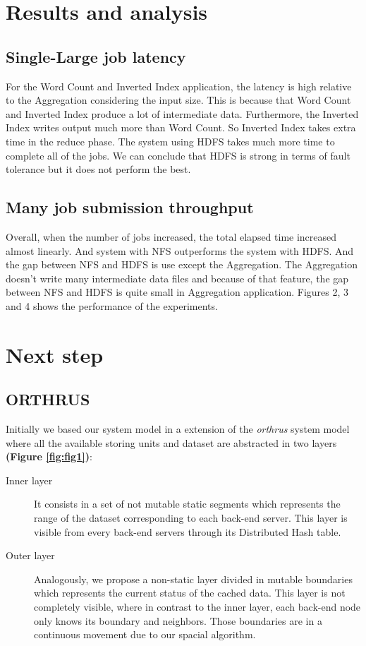 \section*{Results and analysis}
\subsection*{Single-Large job latency}
For the Word Count and Inverted Index application, the latency is high relative to 
the Aggregation considering the input size. This is because that Word Count and Inverted 
Index produce a lot of intermediate data. Furthermore, the Inverted Index writes output 
much more than Word Count. So Inverted Index takes extra time in the reduce phase.
 The system using HDFS takes much more time to complete all of the jobs. We can conclude that HDFS 
is strong in terms of fault tolerance but it does not perform the best.

\subsection*{Many job submission throughput}
Overall, when the number of jobs increased, the total elapsed time increased almost linearly. 
And system with NFS outperforms the system with HDFS. And the gap between NFS and HDFS is use except 
the Aggregation. The Aggregation doesn’t write many intermediate data files and because of that feature, 
the gap between NFS and HDFS is quite small in Aggregation application. Figures 2, 3 and 4 shows the
performance of the experiments.

\section*{Next step}
\subsection*{ORTHRUS}
Initially we based our system model in a extension of the \textit{orthrus} system model where all the available 
storing units and dataset are abstracted in two layers \textbf{(Figure \ref{fig:fig1})}: 

\begin{description}
\item [Inner layer]
It consists in a set of not mutable static segments which represents the range of the dataset corresponding
to each back-end server. This layer is visible from every back-end servers through its Distributed Hash table.

\item[Outer layer]
Analogously, we propose a non-static layer divided in mutable boundaries which 
represents the current status of the cached data. This layer is not completely visible, where
in contrast to the inner layer, each back-end node only knows its boundary and neighbors.
Those boundaries are in a continuous movement due to our spacial algorithm.
\end{description}

